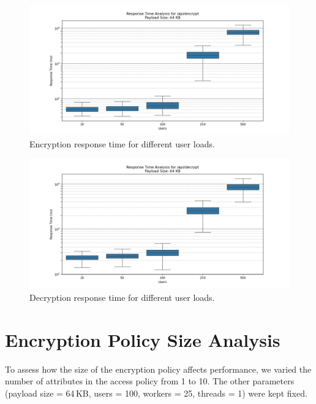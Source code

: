 \documentclass[cic,tc,english]{iiufrgs}
\numberwithin{algorithm}{chapter}
\begin{document}
            \begin{figure}
                \centering
                \includegraphics[width=\textwidth]{images/phase3/response_time_api_encrypt_64KB.png}
                \caption{Encryption response time for different user loads.}
                \label{fig:encrypt_user_load}
            \end{figure}

            \begin{figure}
                \centering
                \includegraphics[width=\textwidth]{images/phase3/response_time_api_decrypt_64KB.png}
                \caption{Decryption response time for different user loads.}
                \label{fig:decrypt_user_load}
            \end{figure}

        \section{Encryption Policy Size Analysis}
        \label{subsec:encryption_policy_size_analysis}

            To assess how the size of the encryption policy affects performance, we varied the number of attributes in the access policy from 1 to 10. The other parameters (payload size = 64\,KB, users = 100, workers = 25, threads = 1) were kept fixed.
\end{document}
